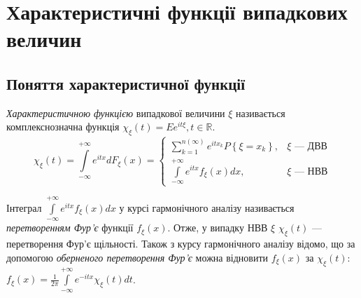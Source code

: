 \section{Характеристичні функції випадкових величин}
\subsection{Поняття характеристичної функції}
\begin{definition}
    \emph{Характеристичною функцією} випадкової величини $\xi$
    називається комплекснозначна функція $\chi_\xi(t) = Ee^{it\xi}, t\in \mathbb{R}$.
    \begin{equation}\label{eq:char_func}
        \chi_\xi(t) = \int\limits_{-\infty}^{+\infty} e^{itx} dF_\xi(x) = \begin{cases}
            \sum\limits_{k=1}^{n(\infty)} e^{itx_k} P\left\{\xi = x_k\right\}, & \xi \text{ --- ДВВ} \\
            \int\limits_{-\infty}^{+\infty} e^{itx} f_\xi(x)dx, & \xi \text{ --- НВВ}
        \end{cases}
    \end{equation}
\end{definition}
Інтеграл $\int\limits_{-\infty}^{+\infty} e^{itx} f_\xi(x)dx$ у курсі
гармонічного аналізу називається \emph{перетворенням Фур'є} функції $f_\xi(x)$.
Отже, у випадку НВВ $\xi$ $\chi_\xi(t)$ --- перетворення Фур'є щільності.
Також з курсу гармонічного аналізу відомо, що за допомогою \emph{оберненого перетворення Фур'є}
можна відновити $f_\xi(x)$ за $\chi_\xi(t)$: $f_\xi(x) = \frac{1}{2\pi}\int\limits_{-\infty}^{+\infty} e^{-itx} \chi_\xi(t)dt$.

